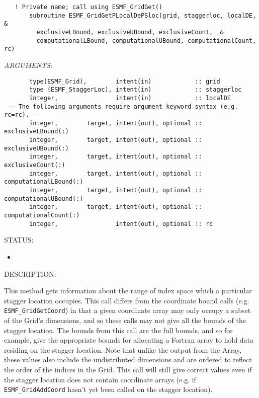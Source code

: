  
\begin{verbatim}   ! Private name; call using ESMF_GridGet()
       subroutine ESMF_GridGetPLocalDePSloc(grid, staggerloc, localDE, &
         exclusiveLBound, exclusiveUBound, exclusiveCount,  &
         computationalLBound, computationalUBound, computationalCount, rc)
 \end{verbatim}{\em ARGUMENTS:}
\begin{verbatim}       type(ESMF_Grid),        intent(in)            :: grid
       type (ESMF_StaggerLoc), intent(in)            :: staggerloc
       integer,                intent(in)            :: localDE
 -- The following arguments require argument keyword syntax (e.g. rc=rc). --
       integer,        target, intent(out), optional :: exclusiveLBound(:)
       integer,        target, intent(out), optional :: exclusiveUBound(:)
       integer,        target, intent(out), optional :: exclusiveCount(:)
       integer,        target, intent(out), optional :: computationalLBound(:)
       integer,        target, intent(out), optional :: computationalUBound(:)
       integer,        target, intent(out), optional :: computationalCount(:)
       integer,                intent(out), optional :: rc\end{verbatim}
{\sf STATUS:}
   \begin{itemize}
   \item{}
   \end{itemize}
  
{\sf DESCRIPTION:\\ }


    This method gets information about the range of index space which a
    particular stagger location occupies. This call differs from the coordinate
    bound calls (e.g. {\tt ESMF\_GridGetCoord}) in that a given coordinate
    array may only occupy a subset of the Grid's dimensions, and
    so these calls may not give all the bounds of the stagger location.
    The bounds from this call are the full bounds, and so
    for example, give the appropriate bounds for allocating a Fortran array to hold
    data residing on the stagger location.
    Note that unlike the output from the Array, these values also include the
    undistributed dimensions and are
    ordered to reflect the order of the indices in the Grid. This call will
    still give correct values even if the stagger location does not contain
    coordinate arrays (e.g. if  {\tt ESMF\_GridAddCoord} hasn't yet
    been called on the stagger location).
  
